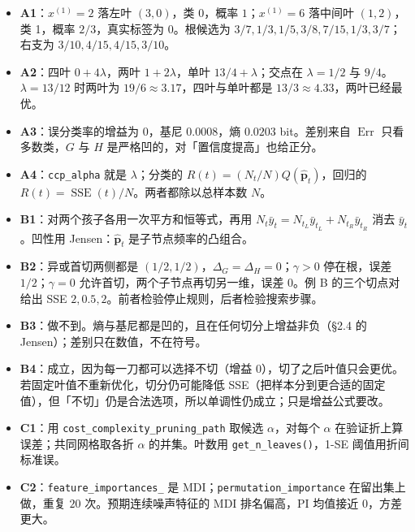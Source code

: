 \documentclass[11pt,a4paper,fontset=windows,zihao=-4]{ctexart}
\newcommand{\bp}{\mathbf{p}}
\DeclareMathOperator{\SSE}{SSE}
\DeclareMathOperator{\Err}{Err}
\begin{document}
\begin{itemize}[itemsep=0.2em]
  \item \textbf{A1}：$x^{(1)}=2$ 落左叶 $(3,0)$，类 0，概率 $1$；$x^{(1)}=6$ 落中间叶 $(1,2)$，类 1，概率 $2/3$，真实标签为 0。根候选为 $3/7,1/3,1/5,3/8,7/15,1/3,3/7$；右支为 $3/10,4/15,4/15,3/10$。
  \item \textbf{A2}：四叶 $0+4\lambda$，两叶 $1+2\lambda$，单叶 $13/4+\lambda$；交点在 $\lambda=1/2$ 与 $9/4$。$\lambda=13/12$ 时两叶为 $19/6\approx3.17$，四叶与单叶都是 $13/3\approx4.33$，两叶已经最优。
  \item \textbf{A3}：误分类率的增益为 $0$，基尼 $0.0008$，熵 $0.0203$ bit。差别来自 $\Err$ 只看多数类，$G$ 与 $H$ 是严格凹的，对「置信度提高」也给正分。
  \item \textbf{A4}：\texttt{ccp\_alpha} 就是 $\lambda$；分类的 $R(t)=(N_t/N)Q(\widehat{\bp}_t)$，回归的 $R(t)=\SSE(t)/N$。两者都除以总样本数 $N$。
  \item \textbf{B1}：对两个孩子各用一次平方和恒等式，再用 $N_t\bar y_t=N_{t_L}\bar y_{t_L}+N_{t_R}\bar y_{t_R}$ 消去 $\bar y_t$。凹性用 Jensen：$\widehat{\bp}_t$ 是子节点频率的凸组合。
  \item \textbf{B2}：异或首切两侧都是 $(1/2,1/2)$，$\Delta_G=\Delta_H=0$；$\gamma>0$ 停在根，误差 $1/2$；$\gamma=0$ 允许首切，两个子节点再切另一维，误差 $0$。例 B 的三个切点对给出 SSE $2,0.5,2$。前者检验停止规则，后者检验搜索步骤。
  \item \textbf{B3}：做不到。熵与基尼都是凹的，且在任何切分上增益非负（§2.4 的 Jensen）；差别只在数值，不在符号。
  \item \textbf{B4}：成立，因为每一刀都可以选择不切（增益 $0$），切了之后叶值只会更优。若固定叶值不重新优化，切分仍可能降低 SSE（把样本分到更合适的固定值），但「不切」仍是合法选项，所以单调性仍成立；只是增益公式要改。
  \item \textbf{C1}：用 \texttt{cost\_complexity\_}\allowbreak\texttt{pruning\_path} 取候选 $\alpha$，对每个 $\alpha$ 在验证折上算误差；共同网格取各折 $\alpha$ 的并集。叶数用 \texttt{get\_n\_leaves()}，1-SE 阈值用折间标准误。
  \item \textbf{C2}：\texttt{feature\_importances\_} 是 MDI；\texttt{permutation\_}\allowbreak\texttt{importance} 在留出集上做，重复 $20$ 次。预期连续噪声特征的 MDI 排名偏高，PI 均值接近 $0$，方差更大。
\end{itemize}

\end{document}

